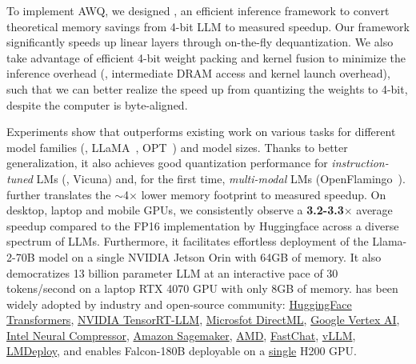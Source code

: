 To implement AWQ, we designed \system, an efficient inference framework to convert theoretical memory savings from 4-bit LLM to measured speedup. Our framework significantly speeds up linear layers through on-the-fly dequantization. We also take advantage of efficient 4-bit weight packing and kernel fusion to minimize the inference overhead (\eg, intermediate DRAM access and kernel launch overhead), such that we can better realize the speed up from quantizing the weights to 4-bit, despite the computer is byte-aligned. 


Experiments show that \methodshort outperforms existing work on various tasks
for  different model families (\eg, LLaMA~\cite{touvron2023llama}, OPT~\cite{opt}) and model sizes.  Thanks to better generalization, it also achieves good quantization performance for \emph{instruction-tuned} LMs (\eg, Vicuna) and, for the first time, \emph{multi-modal} LMs (OpenFlamingo~\cite{openflamingo}). 
\system further translates the $\sim$4$\times$ lower memory footprint to measured speedup. On desktop, laptop and mobile GPUs, we consistently observe a \textbf{3.2-3.3}$\times$ average speedup compared to the FP16 implementation by Huggingface across a diverse spectrum of LLMs. Furthermore, it facilitates effortless deployment of the Llama-2-70B model on a single NVIDIA Jetson Orin with 64GB of memory. It also democratizes 13 billion parameter LLM at an interactive pace of 30 tokens/second on a laptop RTX 4070 GPU with only 8GB of memory.  \methodshort has been widely adopted by industry and open-source community: \href{https://huggingface.co/docs/transformers/main_classes/quantization}{HuggingFace Transformers}, \href{https://github.com/NVIDIA/TensorRT-LLM/}{NVIDIA TensorRT-LLM}, \href{https://blogs.windows.com/windowsdeveloper/2024/05/24/quantization-with-directml-helps-you-scale-further-on-windows/}{Microsfot DirectML}, \href{https://console.cloud.google.com/vertex-ai/publishers/meta/model-garden/llama-2-quantized}{Google Vertex AI}, \href{https://github.com/intel/neural-compressor}{Intel Neural Compressor}, \href{https://aws.amazon.com/blogs/machine-learning/boost-inference-performance-for-llms-with-new-amazon-sagemaker-containers/}{Amazon Sagemaker}, \href{https://community.amd.com/t5/ai/reduce-memory-footprint-and-improve-performance-running-llms-on/ba-p/686157}{AMD}, \href{https://github.com/lm-sys/FastChat/blob/main/docs/awq.md}{FastChat}, \href{https://github.com/vllm-project/vllm/blob/main/vllm/model_executor/layers/quantization/awq.py}{vLLM}, \href{https://github.com/InternLM/lmdeploy}{LMDeploy}, and enables Falcon-180B deployable on a \href{https://github.com/NVIDIA/TensorRT-LLM/blob/main/docs/source/blogs/Falcon180B-H200.md}{single} H200 GPU.







